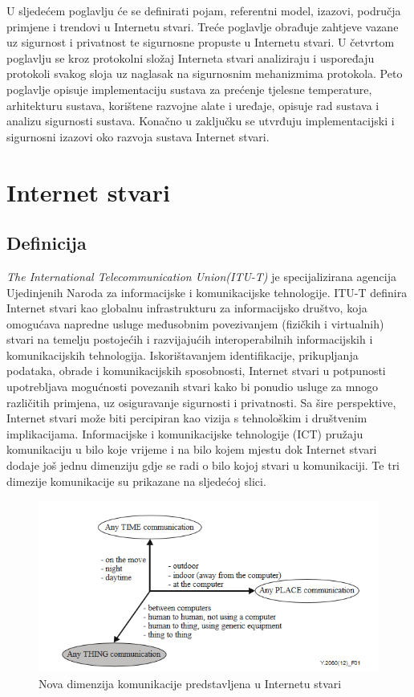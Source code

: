 \documentclass[times, utf8, diplomski]{fer}
\begin{document}
U sljedećem poglavlju će se definirati pojam, referentni model, izazovi, područja primjene i trendovi u Internetu stvari. Treće poglavlje obrađuje zahtjeve vazane uz sigurnost i privatnost te sigurnosne propuste u Internetu stvari. U četvrtom poglavlju se kroz protokolni složaj Interneta stvari analiziraju i uspoređaju protokoli svakog sloja uz naglasak na sigurnosnim mehanizmima protokola. Peto poglavlje opisuje implementaciju sustava za prećenje tjelesne temperature, arhitekturu sustava, korištene razvojne alate i uređaje, opisuje rad sustava i analizu sigurnosti sustava. Konačno u zaključku se utvrđuju implementacijski i sigurnosni izazovi oko razvoja sustava Internet stvari.

\chapter{Internet stvari}

\section{Definicija}
\emph{The International Telecommunication Union(ITU-T)} je specijalizirana agencija Ujedinjenih Naroda za informacijske i komunikacijske tehnologije. ITU-T definira Internet stvari kao globalnu infrastrukturu za informacijsko društvo, koja omogućava napredne usluge međusobnim povezivanjem (fizičkih i virtualnih) stvari na temelju postojećih i razvijajućih interoperabilnih informacijskih i komunikacijskih tehnologija. Iskorištavanjem identifikacije, prikupljanja podataka, obrade i komunikacijskih sposobnosti, Internet stvari u potpunosti upotrebljava mogućnosti povezanih stvari kako bi ponudio usluge za mnogo različitih primjena, uz osiguravanje sigurnosti i privatnosti. Sa šire perspektive, Internet stvari može biti percipiran kao vizija s tehnološkim i društvenim implikacijama\citep{ITU-T/IoT}. Informacijske i komunikacijske tehnologije (ICT) pružaju komunikaciju u bilo koje vrijeme i na bilo kojem mjestu dok Internet stvari dodaje još jednu dimenziju gdje se radi o bilo kojoj stvari u komunikaciji. Te tri dimezije komunikacije su prikazane na sljedećoj slici.
\begin{figure}[htb]
    \centering
    \includegraphics[width=14cm]{images/3dimenzije.png}
    \caption{Nova dimenzija komunikacije predstavljena u Internetu stvari\citep{ITU-T/IoT}}
    \label{fig:3-dim}
\end{figure}
\end{document}
